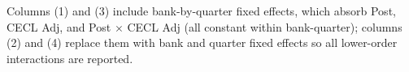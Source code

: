 \par \raggedright 
Columns (1) and (3) include bank-by-quarter fixed effects, which absorb Post, CECL Adj, and Post $\times$ CECL Adj (all constant within bank-quarter); columns (2) and (4) replace them with bank and quarter fixed effects so all lower-order interactions are reported.
\par\endgroup


